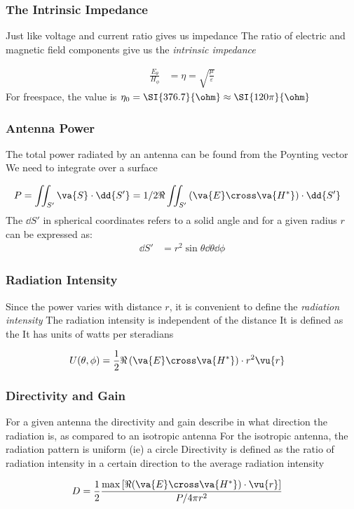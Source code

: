 \documentclass[10pt, compress]{beamer}
\newcommand{\E}{\varepsilon}  %
\renewcommand{\u}{\mu}  %
\begin{document}
\begin{frame}
  \frametitle{The Intrinsic Impedance}  
  \begin{outline}
    \1 Just like voltage and current ratio gives us impedance
    \1 The ratio of electric and magnetic field components give us the \textit{intrinsic impedance}
  \end{outline}
  \begin{align*}
    \frac{E_{\theta}}{H_{\phi}} &= \eta = \sqrt{\frac{\u}{\E}}
  \end{align*}
  For freespace, the value is $\eta_0 = \SI{376.7}{\ohm} \approx \SI{120 \pi}{\ohm}$
\end{frame}


\begin{frame}
  \frametitle{Antenna Power}
  \begin{outline}
    \1 The total power radiated by an antenna can be found from the Poynting vector
    \1 We need to integrate over a surface
  \end{outline}
  \begin{align*}
    P &= \iint_{S'} \va{S} \cdot \dd{S'} = 1/2 \Re \iint_{S'} \left( \va{E} \cross \va{H^{*}}\right) \cdot \dd{S'}
  \end{align*}
  The $\dd{S'}$ in spherical coordinates refers to a solid angle and for a given radius $r$ can be expressed as:
  \begin{align*}
    \dd{S'} &= r^2 \sin \theta \dd{\theta} \dd{\phi}
  \end{align*}
\end{frame}

\begin{frame}
  \frametitle{Radiation Intensity}
  \begin{outline}
    \1 Since the power varies with distance $r$, it is convenient to define the \textit{radiation intensity}
    \1 The radiation intensity is independent of the distance
    \1 It is defined as the \color{red}{power radiated in a given direction per unit solid angle}
    \2 It has units of watts per steradians
  \end{outline}
  \begin{align*}
    U(\theta, \phi) &= \frac{1}{2} \Re \left(\va{E} \cross \va{H^{*}}\right) \cdot r^2 \vu{r}
  \end{align*}
\end{frame}

\begin{frame}
  \frametitle{Directivity and Gain}
  \begin{outline}
    \1 For a given antenna the directivity and gain describe in what direction the radiation is, as compared to an isotropic antenna
    \1 For the isotropic antenna, the radiation pattern is uniform (ie) a circle
    \1 Directivity is defined as the ratio of radiation intensity in a certain direction to the average radiation intensity
  \end{outline}
  \begin{align*}
    D &= \frac{1}{2} \frac{\max \left[\Re (\va{E} \cross \va{H^{*}}) \cdot \vu{r} \right]}{P /4 \pi r^2}
  \end{align*}
\end{frame}
\end{document}
